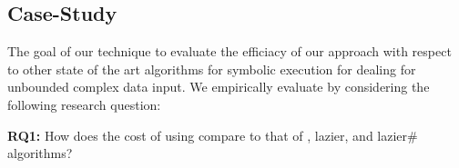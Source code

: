 
\begin{comment}
Loops and recursive methods over symbolic variables are bounded based
on some user-provided limit. These bounds are based on some
control-flow structure of the program and are often insufficient for
analyzing programs with input of complex data types as demonstrated
in~\cite{Kiasan07,Deng:2006}. In this work we use the $k$-bounding
technique that bounds the length of a reference chain from the root of
the heap~\cite{Deng:2006}.\nsr{check this!} Note we use $k$-bounding
because it preserves the functional equivalence of \gsetxt{}, lazier,
lazier\# and \symtxt{} techniques, a fact which can be established by
induction over the length of reference chains from a given initial
state. The $n$-bounding approach restricts the total number of
references created along a certain path. There is no easy way to
compare the number of references generated by \symtxt{} and other
techniques since \symtxt{} can create many references at a single
access point in its heap summary.
\end{comment}


\subsection{Case-Study} 

The goal of our technique to evaluate the efficiacy of our approach
with respect to other state of the art algorithms for symbolic
execution for dealing for unbounded complex data input. We empirically
evaluate \symtxt{} by considering the following research question:

\begin{description}
\item {\bf RQ1:} How does the cost of using \symtxt{} compare to that
  of \gsetxt{}, lazier, and lazier\# algorithms?

\end{description}

